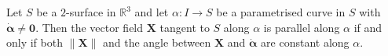 

\begin{corollary}
	Let $S$ be a $2$-surface in $\mathbb{R}^3$ and let $\alpha : I \to S$ be a parametrised curve in $S$ with $\dot{\boldsymbol{\alpha}} \ne \boldsymbol{0}$.
	Then the vector field $\boldsymbol{X}$ tangent to $S$ along $\alpha$ is parallel along $\alpha$ if and only if both $\|\boldsymbol{X}\|$ and the angle between $\boldsymbol{X}$ and $\dot{\boldsymbol{\alpha}}$ are constant along $\alpha$.
\end{corollary}
